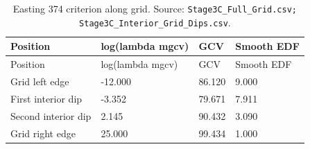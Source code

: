 \begin{longtable}{@{}p{4.2cm}p{4cm}p{2.6cm}p{2.8cm}@{}}
\caption{Easting 374 criterion along grid. Source: \texttt{Stage3C\_Full\_Grid.csv; Stage3C\_Interior\_Grid\_Dips.csv}.}\label{tab:easting-374-criterion-along-grid}\\
\toprule
Position & log(lambda mgcv) & GCV & Smooth EDF\\
\midrule
\endfirsthead
\toprule
Position & log(lambda mgcv) & GCV & Smooth EDF\\
\midrule
\endhead
Grid left edge & -12.000 & 86.120 & 9.000\\
First interior dip & -3.352 & 79.671 & 7.911\\
Second interior dip & 2.145 & 90.432 & 3.090\\
Grid right edge & 25.000 & 99.434 & 1.000\\
\bottomrule
\end{longtable}
